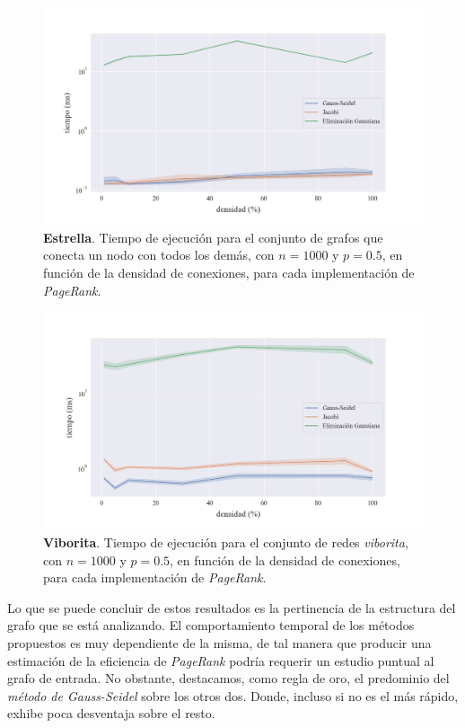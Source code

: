 \begin{figure}[!htbp]
    \centering
    \includegraphics[width=.9\textwidth]{files/src/.media/densidad_uno_a_todos.png}
    \caption{\textbf{Estrella}. Tiempo de ejecución para el conjunto de grafos que conecta un nodo con todos los demás, con $n = 1000$ y $p = 0.5$, en función de la densidad de conexiones, para cada implementación de \textit{PageRank}.}
    \label{densidad_uno_a_todos}
\end{figure}

\begin{figure}[!htbp]
    \centering
    \includegraphics[width=.9\textwidth]{files/src/.media/densidad_viborita.png}
    \caption{\textbf{Viborita}. Tiempo de ejecución para el conjunto de redes \textit{viborita}, con $n = 1000$ y $p = 0.5$, en función de la densidad de conexiones, para cada implementación de \textit{PageRank}.}
    \label{densidad_viborita}
\end{figure}

\vspace{1em}
Lo que se puede concluir de estos resultados es la pertinencia de la estructura del grafo que se está analizando.
El comportamiento temporal de los métodos propuestos es muy dependiente de la misma, de tal manera que
producir una estimación de la eficiencia de \textit{PageRank} podría requerir un estudio puntual al grafo de entrada.
No obstante, destacamos, como regla de oro, el predominio del \textit{método de Gauss-Seidel} sobre los otros dos.
Donde, incluso si no es el más rápido, exhibe poca desventaja sobre el resto.

